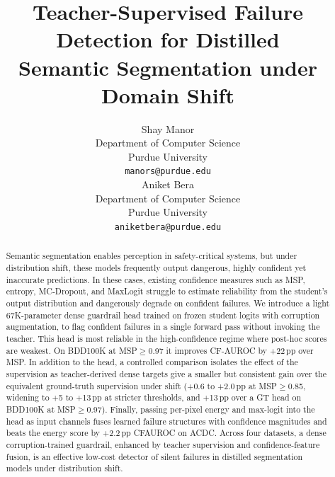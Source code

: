 \documentclass{article}
\title{Teacher-Supervised Failure Detection for Distilled\\Semantic Segmentation under Domain Shift}
\author{%
 Shay Manor \\
 Department of Computer Science \\
 Purdue University \\
 \texttt{manors@purdue.edu} \\
 \And
 Aniket Bera \\
 Department of Computer Science \\
 Purdue University \\
 \texttt{aniketbera@purdue.edu} \\
}
\begin{document}
\maketitle


\begin{abstract}
Semantic segmentation enables perception in safety-critical systems, but under distribution shift, these models frequently output dangerous, highly confident yet inaccurate predictions. In these cases, existing confidence measures such as MSP, entropy, MC-Dropout, and MaxLogit struggle to estimate reliability from the student's output distribution and dangerously degrade on confident failures. We introduce a light 67K-parameter dense guardrail head trained on frozen student logits with corruption augmentation, to flag confident failures in a single forward pass without invoking the teacher. This head is most reliable in the high-confidence regime where post-hoc scores are weakest. On BDD100K at MSP$\geq$0.97 it improves CF-AUROC by +22\,pp over MSP. In addition to the head, a controlled comparison isolates the effect of the supervision as teacher-derived dense targets give a smaller but consistent gain over the equivalent ground-truth supervision under shift (+0.6 to +2.0\,pp at MSP$\geq$0.85, widening to +5 to +13\,pp at stricter thresholds, and +13\,pp over a GT head on BDD100K at MSP$\geq$0.97). Finally, passing per-pixel energy and max-logit into the head as input channels fuses learned failure structures with confidence magnitudes and beats the energy score by +2.2\,pp CFAUROC on ACDC. Across four datasets, a dense corruption-trained guardrail, enhanced by teacher supervision and confidence-feature fusion, is an effective low-cost detector of silent failures in distilled segmentation models under distribution shift.
\end{abstract}
\end{document}
